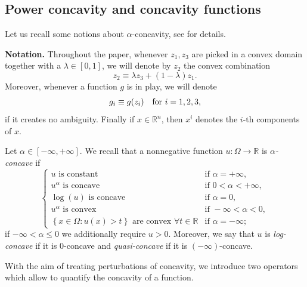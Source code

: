 \documentclass[11pt, reqno]{amsart}
\theoremstyle{definition}
\numberwithin{equation}{section}
\newcommand{\R}{\mathbb{R}}
\begin{document}
\subsection{Power concavity and concavity functions}

Let us recall some notions about $\alpha$-concavity, see \cite{kennington} for details. 

\smallskip

\textbf{Notation.} Throughout the paper, whenever $z_1, z_3$ are picked in a convex domain together with a $\lambda \in [0,1]$, we will denote by $z_2$ the convex combination
$$z_2 \equiv \lambda z_3 + (1-\lambda) z_1.$$
Moreover, whenever a function $g$ is in play, we will denote 
$$g_i \equiv g(z_i) \quad \hbox{for $i=1,2,3$},$$
if it creates no ambiguity. Finally if $x\in \R^n$, then $x^i$ denotes the $i$-th components of $x$.

\medskip

Let $\alpha \in [-\infty, +\infty]$. We recall that a nonnegative function $u\colon\Omega \to \R$ is \emph{$\alpha$-concave} if 
\begin{equation}\label{eq_def_alpha_concav}
	\begin{cases}
		u \text{ is constant} & \text{if } \alpha =+\infty,\\
		u^\alpha \text{ is concave} & \text{if } 0<\alpha<+\infty,\\
		\log(u) \text{ is concave} & \text{if } \alpha =0,\\
		u^\alpha \text{ is convex} & \text{if } -\infty<\alpha<0,\\
		\left\{ x\in \Omega: u(x)>t\right\} \text{ are convex }\forall t\in \R & \text{if }\alpha=-\infty;
	\end{cases}
\end{equation}
if $-\infty<\alpha\leq 0$ we additionally require $u>0$. 
Moreover, we say that $u$ is \emph{log-concave} if it is $0$-concave and \emph{quasi-concave} if it is $(-\infty)$-concave.

 With the aim of treating perturbations of concavity, we introduce two operators which allow to quantify the concavity of a function.
\end{document}
